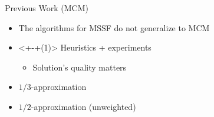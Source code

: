 \begin{frame}{Previous Work (MCM)}
\begin{itemize}[<+>]
	\item The algorithms for MSSF do not generalize to MCM  
	\item<+-+(1)> Heuristics + experiments
  		\begin{itemize}[<+>]
  			\item Solution's quality \alert{matters}
		\end{itemize}
		\item $1/3$-approximation 
		\item $1/2$-approximation (unweighted) 
\end{itemize}
\end{frame}